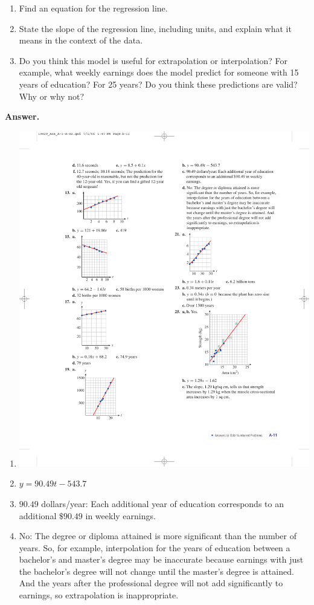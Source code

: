 \documentclass[10pt,]{book}
\theoremstyle{plain}
\theoremstyle{definition}
\theoremstyle{definition}
\theoremstyle{definition}
\theoremstyle{definition}
\numberwithin{equation}{part}
\begin{document}
\begin{exerciselist}
\begin{enumerate}[label=*\alph**]
\item\hypertarget{li-1421}{}Find an equation for the regression line.%
\item\hypertarget{li-1422}{}State the slope of the regression line, including units, and explain what it means in the context of the data.%
\item\hypertarget{li-1423}{}Do you think this model is useful for extrapolation or interpolation? For example, what weekly earnings does the model predict for someone with 15 years of education? For 25 years? Do you think these predictions are valid? Why or why not?%
\end{enumerate}
%
\par\smallskip
\par\smallskip
\noindent\textbf{Answer.}\hypertarget{answer-211}{}\quad
\leavevmode%
\begin{multicols}{2}
\begin{enumerate}[label=*\alph**]
\item\hypertarget{li-1424}{}\includegraphics[width=0.8\linewidth]{images/fig-ans-1-6-19}
%
\item\hypertarget{li-1425}{}\(y = 90.49t - 543.7\)%
\item\hypertarget{li-1426}{}\(90.49\) dollars/year: Each additional year of education corresponds to an additional \(\$90.49\) in weekly earnings.%
\item\hypertarget{li-1427}{}No: The degree or diploma attained is more significant than the number of years. So, for example, interpolation for the years of education between a bachelor's and master's degree may be inaccurate because earnings with just the bachelor's degree will not change until the master's degree is attained. And the years after the professional degree will not add significantly to earnings, so extrapolation is inappropriate.%

\end{enumerate}
\end{multicols}
\end{exerciselist}
\end{document}
